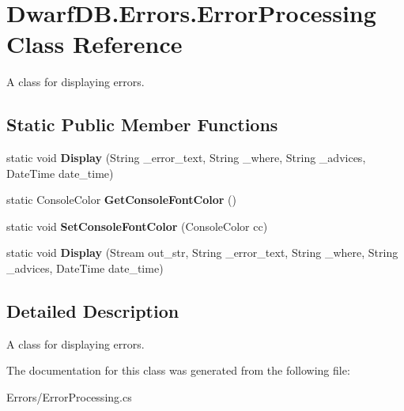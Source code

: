 \hypertarget{class_dwarf_d_b_1_1_errors_1_1_error_processing}{
\section{DwarfDB.Errors.ErrorProcessing Class Reference}
\label{class_dwarf_d_b_1_1_errors_1_1_error_processing}
}


A class for displaying errors.  


\subsection*{Static Public Member Functions}
\begin{DoxyCompactItemize}
\item 
\hypertarget{class_dwarf_d_b_1_1_errors_1_1_error_processing_a68c6bfa1f5bf2da33703992cfed77731}{
static void {\bfseries Display} (String \_\-error\_\-text, String \_\-where, String \_\-advices, DateTime date\_\-time)}
\label{class_dwarf_d_b_1_1_errors_1_1_error_processing_a68c6bfa1f5bf2da33703992cfed77731}

\item 
\hypertarget{class_dwarf_d_b_1_1_errors_1_1_error_processing_a051751b672ee28d2608be8a20652de8d}{
static ConsoleColor {\bfseries GetConsoleFontColor} ()}
\label{class_dwarf_d_b_1_1_errors_1_1_error_processing_a051751b672ee28d2608be8a20652de8d}

\item 
\hypertarget{class_dwarf_d_b_1_1_errors_1_1_error_processing_a599cbddaaebbdeca35d795b2010254e6}{
static void {\bfseries SetConsoleFontColor} (ConsoleColor cc)}
\label{class_dwarf_d_b_1_1_errors_1_1_error_processing_a599cbddaaebbdeca35d795b2010254e6}

\item 
\hypertarget{class_dwarf_d_b_1_1_errors_1_1_error_processing_aab993dd16fc5fb11db9ef496c6aa1980}{
static void {\bfseries Display} (Stream out\_\-str, String \_\-error\_\-text, String \_\-where, String \_\-advices, DateTime date\_\-time)}
\label{class_dwarf_d_b_1_1_errors_1_1_error_processing_aab993dd16fc5fb11db9ef496c6aa1980}

\end{DoxyCompactItemize}


\subsection{Detailed Description}
A class for displaying errors. 

The documentation for this class was generated from the following file:\begin{DoxyCompactItemize}
\item 
Errors/ErrorProcessing.cs\end{DoxyCompactItemize}
